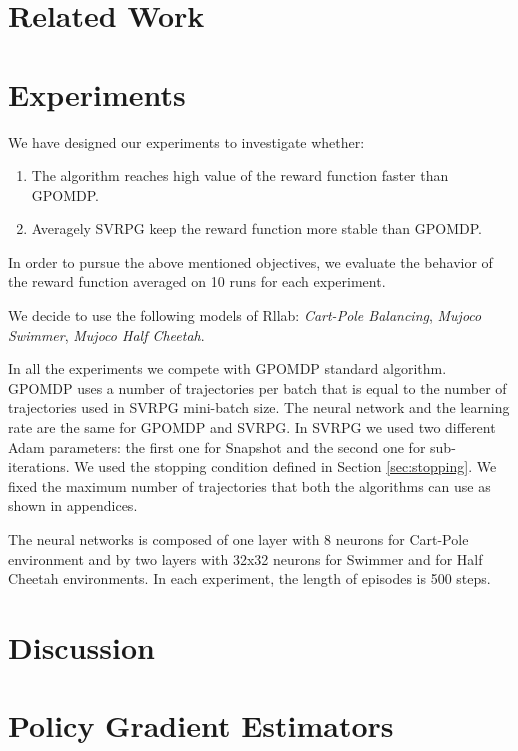 \documentclass{article}
\theoremstyle{remark}
\theoremstyle{definition}
\begin{document}
\section{Related Work}

\section{Experiments}\label{sec:exp}
We have designed our experiments to investigate whether:
\begin{enumerate}
\item The algorithm reaches high value of the reward function faster than GPOMDP.
\item Averagely SVRPG keep the reward function more stable than GPOMDP.
\end{enumerate}

In order to pursue the above mentioned objectives, we evaluate the behavior of the reward function averaged on 10 runs for each experiment.

We decide to use the following models of Rllab: \emph{Cart-Pole Balancing}, \emph{Mujoco Swimmer}, \emph{Mujoco Half Cheetah}.


In all the experiments we compete with GPOMDP standard algorithm. GPOMDP uses a number of trajectories per batch that is equal to the number of trajectories used in SVRPG mini-batch size.
The neural network and the learning rate are the same for GPOMDP and SVRPG.
In SVRPG we used two different Adam parameters: the first one for Snapshot and the second one for sub-iterations.
We used the stopping condition defined in Section \ref{sec:stopping}.
We fixed the maximum number of trajectories that both the algorithms can use as shown in appendices. 

The neural networks is composed of one layer with 8 neurons for Cart-Pole environment and by two layers with 32x32 neurons for Swimmer and for Half Cheetah environments. In each experiment, the length of episodes is 500 steps.

\section{Discussion}




\newpage
\mbox{}
\newpage
\onecolumn
\appendix

\section{Policy Gradient Estimators} \label{A:gradient_estimators}
\end{document}
